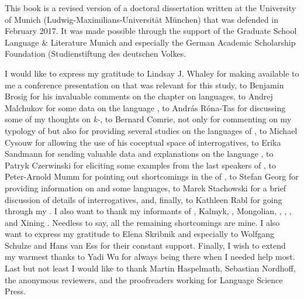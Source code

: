 
This book is a revised version of a doctoral dissertation written at the University of Munich (Ludwig-Maximilians-Universität München) that was defended in February 2017. It was made possible through the support of the Graduate School Language \& Literature Munich and especially the German Academic Scholarship Foundation (Studienstiftung des deutschen Volkes.

I would like to express my gratitude to Lindsay J. Whaley for making available to me a conference presentation on  that was relevant for this study, to Benjamin Brosig for his invaluable comments on the chapter on  languages, to Andrej Malchukov for some data on the language , to András Róna-Tas for discussing some of my thoughts on  \textit{k-}, to Bernard Comrie, not only for commenting on my typology of  but also for providing several studies on the languages of , to Michael Cysouw for allowing the use of his coceptual space of interrogatives, to Erika Sandmann for sending valuable data and explanations on the language , to Patryk Czerwinski for eliciting some examples from the last speakers of , to Peter-Arnold Mumm for pointing out shortcomings in the  of , to Stefan Georg for providing information on  and some  languages, to Marek Stachowski for a brief discussion of details of  interrogatives, and, finally, to Kathleen Rabl for going through my . I also want to thank my informants of , Kalmyk, ,  Mongolian, , , , and Xining . Needless to say, all the remaining shortcomings are mine. I also want to express my gratitude to Elena Skribnik and especially to Wolfgang Schulze and Hans van Ess for their constant support. Finally, I wish to extend my warmest thanks to Yadi Wu for always being there when I needed help most. Last but not least I would like to thank Martin Haspelmath, Sebastian Nordhoff, the anonymous reviewers, and the proofreaders working for Language Science Press.
